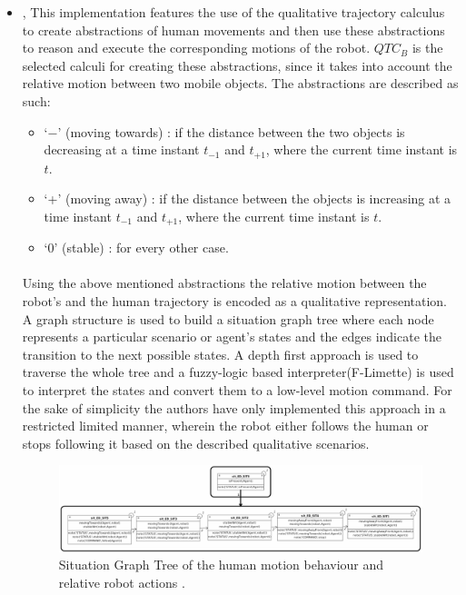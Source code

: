 \begin{itemize}
	\item \cite{bellotto2012robot}, This implementation features the use of the qualitative trajectory calculus to create abstractions of human movements and then use these abstractions to reason and execute the corresponding motions of the robot. $QTC_B$ is the selected calculi for creating these abstractions, since it takes into account the relative motion between two mobile objects. The abstractions are described as such:
	\begin{itemize}
		\item `−' (moving towards) : if the distance between the two objects is decreasing at a time instant $t_{-1}$ and $t_{+1}$, where the current time instant is $t$.
		\item `+' (moving away) : if the distance between the objects is increasing at a time instant $t_{-1}$ and $t_{+1}$, where the current time instant is $t$.
		\item `0' (stable) : for every other case.
	\end{itemize}
	\paragraph{} Using the above mentioned abstractions the relative motion between the robot's and the human trajectory is encoded as a qualitative representation. A graph structure is used to build a situation graph tree where each node represents a particular scenario or agent's states and the edges indicate the transition to the next possible states. A depth first approach is used to traverse the whole tree and a fuzzy-logic based interpreter(F-Limette) is used to  interpret the states and convert them to a low-level motion command. For the sake of simplicity the authors have only implemented this approach in a restricted limited manner, wherein the robot either follows the human or stops following it based on the described qualitative scenarios.
	\begin{figure}[h]
		\centering
		\includegraphics[scale = 0.6]{images/graph}
		\caption{Situation Graph Tree of the human motion behaviour and relative robot actions \cite{bellotto2012robot}.}
		\label{fig:graph}
	\end{figure}
	

\end{itemize}
